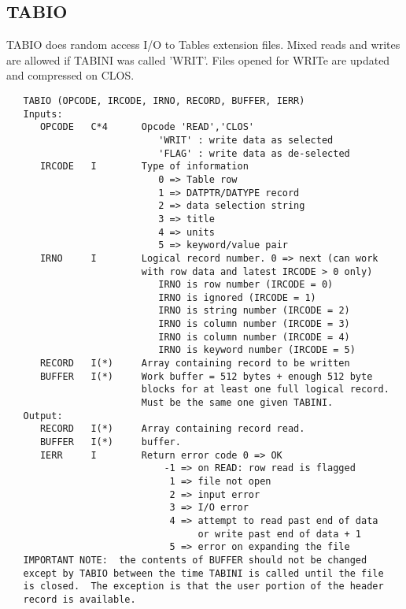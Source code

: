 \subsection{TABIO}
TABIO does random access I/O to Tables extension files.  Mixed
reads and writes are allowed if TABINI was called 'WRIT'.
Files opened for WRITe are updated and compressed on CLOS.
\begin{verbatim}
   TABIO (OPCODE, IRCODE, IRNO, RECORD, BUFFER, IERR)
   Inputs:
      OPCODE   C*4      Opcode 'READ','CLOS'
                           'WRIT' : write data as selected
                           'FLAG' : write data as de-selected
      IRCODE   I        Type of information
                           0 => Table row
                           1 => DATPTR/DATYPE record
                           2 => data selection string
                           3 => title
                           4 => units
                           5 => keyword/value pair
      IRNO     I        Logical record number. 0 => next (can work
                        with row data and latest IRCODE > 0 only)
                           IRNO is row number (IRCODE = 0)
                           IRNO is ignored (IRCODE = 1)
                           IRNO is string number (IRCODE = 2)
                           IRNO is column number (IRCODE = 3)
                           IRNO is column number (IRCODE = 4)
                           IRNO is keyword number (IRCODE = 5)
      RECORD   I(*)     Array containing record to be written
      BUFFER   I(*)     Work buffer = 512 bytes + enough 512 byte
                        blocks for at least one full logical record.
                        Must be the same one given TABINI.
   Output:
      RECORD   I(*)     Array containing record read.
      BUFFER   I(*)     buffer.
      IERR     I        Return error code 0 => OK
                            -1 => on READ: row read is flagged
                             1 => file not open
                             2 => input error
                             3 => I/O error
                             4 => attempt to read past end of data
                                  or write past end of data + 1
                             5 => error on expanding the file
   IMPORTANT NOTE:  the contents of BUFFER should not be changed
   except by TABIO between the time TABINI is called until the file
   is closed.  The exception is that the user portion of the header
   record is available.
\end{verbatim}

